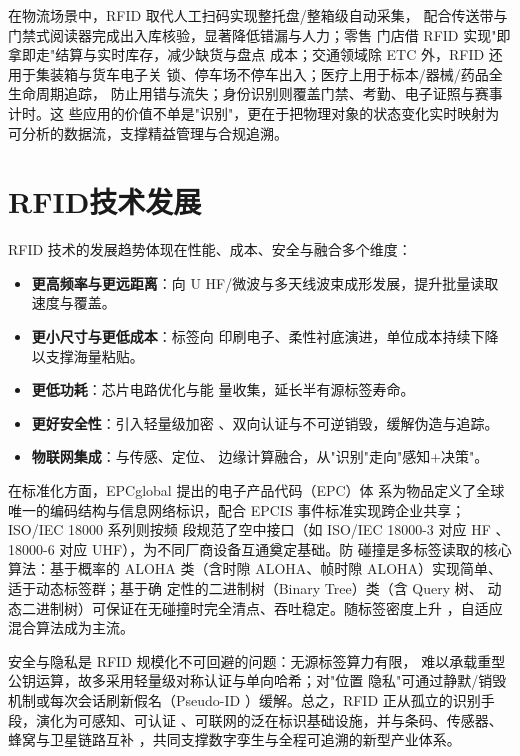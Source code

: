 在物流场景中，RFID 取代人工扫码实现整托盘/整箱级自动采集，
配合传送带与门禁式阅读器完成出入库核验，显著降低错漏与人力；零售
门店借 RFID 实现"即拿即走"结算与实时库存，减少缺货与盘点
成本；交通领域除 ETC 外，RFID 还用于集装箱与货车电子关
锁、停车场不停车出入；医疗上用于标本/器械/药品全生命周期追踪，
防止用错与流失；身份识别则覆盖门禁、考勤、电子证照与赛事计时。这
些应用的价值不单是"识别"，更在于把物理对象的状态变化实时映射为
可分析的数据流，支撑精益管理与合规追溯。

\section{RFID技术发展}
\label{sec:rfid_development}

RFID 技术的发展趋势体现在性能、成本、安全与融合多个维度：

\begin{itemize}
    \item \textbf{更高频率与更远距离}：向 U
HF/微波与多天线波束成形发展，提升批量读取速度与覆盖。
    \item \textbf{更小尺寸与更低成本}：标签向
印刷电子、柔性衬底演进，单位成本持续下降以支撑海量粘贴。
    \item \textbf{更低功耗}：芯片电路优化与能
量收集，延长半有源标签寿命。
    \item \textbf{更好安全性}：引入轻量级加密
、双向认证与不可逆销毁，缓解伪造与追踪。
    \item \textbf{物联网集成}：与传感、定位、
边缘计算融合，从"识别"走向"感知+决策"。
\end{itemize}

在标准化方面，EPCglobal 提出的电子产品代码（EPC）体
系为物品定义了全球唯一的编码结构与信息网络标识，配合 EPCIS
 事件标准实现跨企业共享；ISO/IEC 18000 系列则按频
段规范了空中接口（如 ISO/IEC 18000-3 对应 HF
、18000-6 对应 UHF），为不同厂商设备互通奠定基础。防
碰撞是多标签读取的核心算法：基于概率的 ALOHA 类（含时隙 
ALOHA、帧时隙 ALOHA）实现简单、适于动态标签群；基于确
定性的二进制树（Binary Tree）类（含 Query 树、
动态二进制树）可保证在无碰撞时完全清点、吞吐稳定。随标签密度上升
，自适应混合算法成为主流。

安全与隐私是 RFID 规模化不可回避的问题：无源标签算力有限，
难以承载重型公钥运算，故多采用轻量级对称认证与单向哈希；对"位置
隐私"可通过静默/销毁机制或每次会话刷新假名（Pseudo-ID
）缓解。总之，RFID 正从孤立的识别手段，演化为可感知、可认证
、可联网的泛在标识基础设施，并与条码、传感器、蜂窝与卫星链路互补
，共同支撑数字孪生与全程可追溯的新型产业体系。

